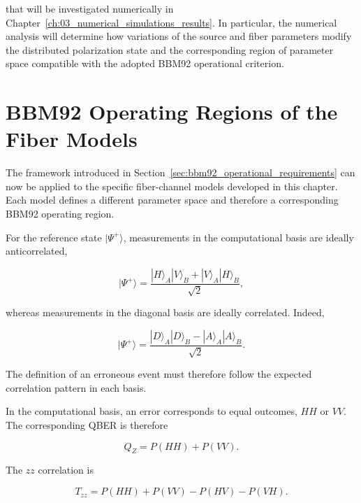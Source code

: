 that will be investigated numerically in
Chapter~\ref{ch:03_numerical_simulations_results}. In particular, the numerical
analysis will determine how variations of the source and fiber parameters modify
the distributed polarization state and the corresponding region of parameter
space compatible with the adopted BBM92 operational criterion.


\section{BBM92 Operating Regions of the Fiber Models}
\label{sec:bbm92_operating_regions_fiber_models}

The framework introduced in
Section~\ref{sec:bbm92_operational_requirements} can now be applied to the
specific fiber-channel models developed in this chapter. Each model defines a
different parameter space and therefore a corresponding BBM92 operating region.

For the reference state \( |\Psi^+\rangle \), measurements in the computational
basis are ideally anticorrelated,

\begin{equation}
|\Psi^+\rangle
=
\frac{
|H\rangle_A|V\rangle_B
+
|V\rangle_A|H\rangle_B
}{\sqrt{2}},
\nonumber
\end{equation}

whereas measurements in the diagonal basis are ideally correlated. Indeed,

\begin{equation}
|\Psi^+\rangle
=
\frac{
|D\rangle_A|D\rangle_B
-
|A\rangle_A|A\rangle_B
}{\sqrt{2}}.
\end{equation}

The definition of an erroneous event must therefore follow the expected
correlation pattern in each basis.

In the computational basis, an error corresponds to equal outcomes,
\(HH\) or \(VV\). The corresponding QBER is therefore

\begin{equation}
Q_Z
=
P(HH)+P(VV).
\label{eq:qber_z_probabilities}
\end{equation}

The \(zz\) correlation is

\begin{equation}
T_{zz}
=
P(HH)+P(VV)-P(HV)-P(VH).
\label{eq:tzz_joint_probabilities}
\end{equation}

